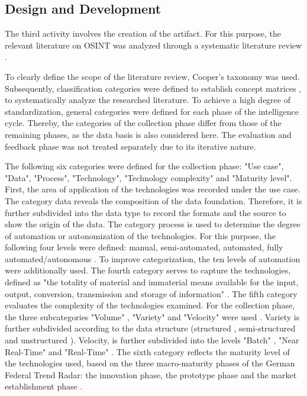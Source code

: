 \documentclass[10pt]{article}
\begin{document}
\subsection{Design and Development}

The third activity involves the creation of the artifact. For this
purpose, the relevant literature on OSINT was analyzed through a
systematic literature review \cite{Cleven.2009}.

To clearly define the scope of the literature
review, Cooper's taxonomy \cite{Cooper.1988} was used. Subsequently, classification
categories were defined to establish concept matrices \cite{Webster.2002},
to systematically analyze the
researched literature. To achieve a high degree of standardization,
general categories were defined for each phase of the intelligence
cycle. Thereby, the categories of the collection phase differ from
those of the remaining phases, as the data basis is also considered
here. The evaluation and feedback phase was not treated separately due
to its iterative nature.

The following six categories were defined for the collection
phase: "Use case", "Data", "Process", "Technology", "Technology
complexity" and "Maturity level". First, the area of application
of the technologies was recorded under the use case. The
category data reveals the composition of the data foundation. Therefore,
it is further subdivided into the data type to record the formats and
the source to show the origin of the data. The category
process is used to determine the degree of automation or
autonomization of the technologies. For this purpose, the following
four levels were defined: manual, semi-automated, automated,
\cite{Duncheon.2002} fully automated/autonomous \cite{Billings.1997,Endsley.1999}.
To improve categorization, the ten levels of automation \cite{Sheridan.1978,Parasuraman.2000}
were additionally used. The fourth category serves to capture the technologies, defined
as "the totality of material and immaterial means available for
the input, output, conversion, transmission and storage of information" \cite{Bleck.2004}.
The fifth category evaluates the complexity of the technologies
examined. For the collection phase, the three subcategories
"Volume" \cite{OLeary.2012}, "Variety" and "Velocity" were used \cite{Elgendy.,Russom.2011,Singh.2012}.
Variety is further subdivided according to the data structure (structured \cite{Lin.2018},
semi-structured and unstructured \cite{Katal.2013,Praveen.2020})\cite{OLeary.2012}. Velocity,
is further subdivided into the levels "Batch" \cite{Carbone.2015}, "Near Real-Time"
\cite{Stankovic.1990,Gomes.2021} and "Real-Time" \cite{Stankovic.1990}. The sixth category reflects the
maturity level of the technologies used, based on the three macro-maturity phases of the
German Federal Trend Radar: the innovation phase, the prototype phase and
the market establishment phase \cite{Stich.2022}.
\end{document}
